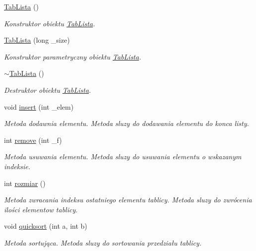 \begin{DoxyCompactItemize}
\item 
\hyperlink{class_tab_lista_ad3bfa98306e98b4e5bb7ff524e72078c}{Tab\+Lista} ()
\begin{DoxyCompactList}\small\item\em Konstruktor obiektu \hyperlink{class_tab_lista}{Tab\+Lista}. \end{DoxyCompactList}\item 
\hyperlink{class_tab_lista_a95d23d52e0af187351b3fc1022ae4839}{Tab\+Lista} (long \+\_\+size)
\begin{DoxyCompactList}\small\item\em Konstruktor parametryczny obiektu \hyperlink{class_tab_lista}{Tab\+Lista}. \end{DoxyCompactList}\item 
\hyperlink{class_tab_lista_a0b4a808158b370bbc5785ceef760a273}{$\sim$\+Tab\+Lista} ()
\begin{DoxyCompactList}\small\item\em Destruktor obiektu \hyperlink{class_tab_lista}{Tab\+Lista}. \end{DoxyCompactList}\item 
void \hyperlink{class_tab_lista_a7bd3e5f62a81bfd3813ad874e8a9c059}{insert} (int \+\_\+elem)
\begin{DoxyCompactList}\small\item\em Metoda dodawnia elementu. Metoda sluzy do dodawania elementu do konca listy. \end{DoxyCompactList}\item 
int \hyperlink{class_tab_lista_aae59a3eafbbd7424a952badb26410a5e}{remove} (int \+\_\+f)
\begin{DoxyCompactList}\small\item\em Metoda usuwania elementu. Metoda sluzy do usuwania elementu o wskazanym indeksie. \end{DoxyCompactList}\item 
int \hyperlink{class_tab_lista_ac4b9b266a861fc7ecffd60257a480991}{rozmiar} ()
\begin{DoxyCompactList}\small\item\em Metoda zwracania indeksu ostatniego elementu tablicy. Metoda sluzy do zwrócenia ilości elementow tablicy. \end{DoxyCompactList}\item 
void \hyperlink{class_tab_lista_a7e7acd97b2675b82b9a0f50907e87c22}{quicksort} (int a, int b)
\begin{DoxyCompactList}\small\item\em Metoda sortująca. Metoda sluzy do sortowania przedziału tablicy. \end{DoxyCompactList}\end{DoxyCompactItemize}
